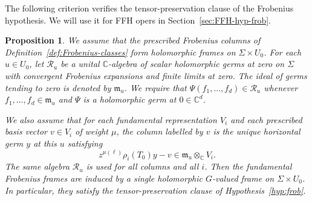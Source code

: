 \documentclass[11pt,leqno]{amsart}
\numberwithin{equation}{section}
\theoremstyle{plain}
\newtheorem{proposition}[theorem]{Proposition}
\theoremstyle{definition}
\theoremstyle{plain}
\theoremstyle{definition}
\theoremstyle{remark}
\begin{document}
The following criterion verifies the tensor-preservation clause of the Frobenius hypothesis.  We will use it for FFH opers in Section~\ref{sec:FFH-hyp-frob}.

\begin{proposition}\label{prop:Frobenius-tensor-prescription}\label{rem:Frobenius-tensor-prescription}
We assume that the prescribed Frobenius columns of Definition~\ref{def:Frobenius-classes} form holomorphic frames on $\Sigma\times U_0$.  For each $u\in U_0$, let $\mathcal R_u$ be a unital $\mathbb C$-algebra of scalar holomorphic germs at zero on $\Sigma$ with convergent Frobenius expansions and finite limits at zero.  The ideal of germs tending to zero is denoted by $\mathfrak m_u$.  We require that $\Psi(f_1,\ldots,f_d)\in\mathcal R_u$ whenever $f_1,\ldots,f_d\in\mathfrak m_u$ and $\Psi$ is a holomorphic germ at $0\in\mathbb C^d$.

We also assume that for each fundamental representation $V_i$ and each prescribed basis vector $v\in V_i$ of weight $\mu$, the column labelled by $v$ is the unique horizontal germ $y$ at this $u$ satisfying
\[
 z^{\mu(\ell)}\rho_i(T_0)y-v\in\mathfrak m_u\otimes_{\mathbb C} V_i .
\]
The same algebra $\mathcal R_u$ is used for all columns and all $i$.  Then the fundamental Frobenius frames are induced by a single holomorphic $G$-valued frame on $\Sigma\times U_0$.  In particular, they satisfy the tensor-preservation clause of Hypothesis~\ref{hyp:frob}.
\end{proposition}
\end{document}
